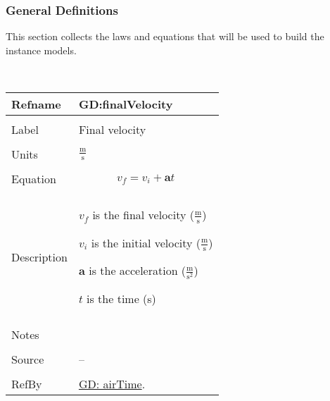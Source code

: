 \documentclass[12pt]{article}
\begin{document}
\subsubsection{General Definitions}
\label{Sec:GDs}
This section collects the laws and equations that will be used to build the instance models.
\par~

\noindent \begin{minipage}{\textwidth}
\begin{tabular}{p{} p{}}
\toprule \textbf{Refname} & \textbf{GD:finalVelocity}
\label{GD:finalVelocity}
\\ \midrule \\
Label & Final velocity
\\ \midrule \\
Units & $\frac{\text{m}}{\text{s}}$
\\ \midrule \\
Equation & \begin{displaymath}
           {v_{f}}={v_{i}}+\mathbf{a} t
           \end{displaymath}
\\ \midrule \\
Description & \begin{symbDescription}
              \item{${v_{f}}$ is the final velocity ($\frac{\text{m}}{\text{s}}$)}
              \item{${v_{i}}$ is the initial velocity ($\frac{\text{m}}{\text{s}}$)}
              \item{$\mathbf{a}$ is the acceleration ($\frac{\text{m}}{\text{s}^{2}}$)}
              \item{$t$ is the time (s)}
              \end{symbDescription}
\\ \midrule \\
Notes & 
\\ \midrule \\
Source & --
\\ \midrule \\
RefBy & \hyperref[GD:airTime]{GD: airTime}.
\\ \bottomrule \end{tabular}
\end{minipage}
\par~
\end{document}
